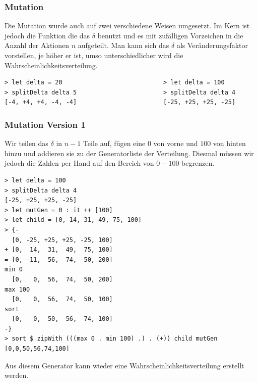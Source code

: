             \subsubsection*{Mutation}
            Die Mutation wurde auch auf zwei verschiedene Weisen umgesetzt. Im Kern ist jedoch die Funktion die das $\delta$ benutzt und es mit zufälligen Vorzeichen in die Anzahl der Aktionen $n$ aufgeteilt. Man kann sich das $\delta$ als Veränderungsfaktor vorstellen, je höher er ist, umso unterschiedlicher wird die Wahrscheinlichkeitsverteilung.
            \begin{mdframed}
                \begin{verbatim}
> let delta = 20                            > let delta = 100
> splitDelta delta 5                        > splitDelta delta 4
[-4, +4, +4, -4, -4]                        [-25, +25, +25, -25]
                \end{verbatim}
            \end{mdframed}

            \subsubsection*{Mutation Version 1}
            Wir teilen das $\delta$ in $n-1$ Teile auf, fügen eine $0$ von vorne und $100$ von hinten hinzu und addieren sie zu der Generatorliste der Verteilung. Diesmal müssen wir jedoch die Zahlen per Hand auf den Bereich von $0 - 100$ begrenzen.
            \begin{mdframed}
            \begin{verbatim}
> let delta = 100
> splitDelta delta 4
[-25, +25, +25, -25]
> let mutGen = 0 : it ++ [100]
> let child = [0, 14, 31, 49, 75, 100]
> {-
  [0, -25, +25, +25, -25, 100]
+ [0,  14,  31,  49,  75, 100]
= [0, -11,  56,  74,  50, 200]
min 0
  [0,   0,  56,  74,  50, 200]
max 100
  [0,   0,  56,  74,  50, 100]
sort
  [0,   0,  50,  56,  74, 100]
-}
> sort $ zipWith (((max 0 . min 100) .) . (+)) child mutGen
[0,0,50,56,74,100]
            \end{verbatim}
            \end{mdframed}
            Aus diesem Generator kann wieder eine Wahrscheinlichkeitsverteilung erstellt werden.

